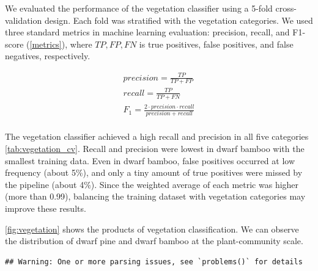 \documentclass{article}
\begin{document}
We evaluated the performance of the vegetation classifier using a 5-fold cross-validation design. Each fold was stratified with the vegetation categories. We used three standard metrics in machine learning evaluation: precision, recall, and F1-score (\ref{metrics}), where \(TP, FP, FN\) is true positives, false positives, and false negatives, respectively.

\label{metrics}
\begin{align}
  precision = \frac{TP}{TP + FP} \\
  recall = \frac{TP}{TP + FN} \\
  F_1 = \frac{2 \cdot precision \cdot recall}{precision + recall} \\
\end{align}

The vegetation classifier achieved a high recall and precision in all five categories \ref{tab:vegetation_cv}. Recall and precision were lowest in dwarf bamboo with the smallest training data. Even in dwarf bamboo, false positives occurred at low frequency (about 5\%), and only a tiny amount of true positives were missed by the pipeline (about 4\%). Since the weighted average of each metric was higher (more than 0.99), balancing the training dataset with vegetation categories may improve these results.

\ref{fig:vegetation} shows the products of vegetation classification. We can observe the distribution of dwarf pine and dwarf bamboo at the plant-community scale.

\begin{verbatim}
## Warning: One or more parsing issues, see `problems()` for details
\end{verbatim}
\end{document}
